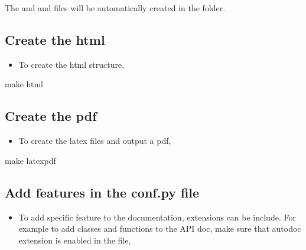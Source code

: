 \documentclass[letterpaper,10pt,english]{sphinxmanual}
\begin{document}
The  and   and  files will be automatically created in the
 folder.


\subsection{Create the html}
\label{\detokenize{toc-README-docs:create-the-html}}\begin{itemize}
\item {} 
To create the html structure,

\end{itemize}

\begin{sphinxVerbatim}[commandchars=\\\{\}]
make html
\end{sphinxVerbatim}


\subsection{Create the pdf}
\label{\detokenize{toc-README-docs:create-the-pdf}}\begin{itemize}
\item {} 
To create the latex files and output a pdf,

\end{itemize}

\begin{sphinxVerbatim}[commandchars=\\\{\}]
make latexpdf
\end{sphinxVerbatim}


\subsection{Add features in the conf.py file}
\label{\detokenize{toc-README-docs:add-features-in-the-conf-py-file}}\begin{itemize}
\item {} 
To add specific feature to the documentation, extensions can be include.
For example to add classes and functions to the API doc, make sure that autodoc
extension is enabled in the  file,

\end{itemize}

\begin{sphinxVerbatim}[commandchars=\\\{\}]
  \PYG{p}{[}\PYG{p}{]}
\end{sphinxVerbatim}
\end{document}
